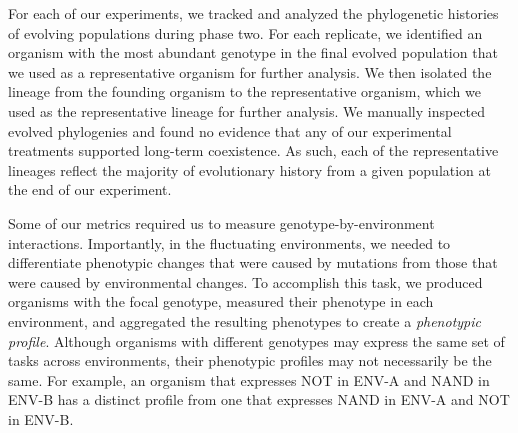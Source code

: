 


For each of our experiments, we tracked and analyzed the phylogenetic histories of evolving populations during phase two. 
For each replicate, we identified an organism with the most abundant genotype in the final evolved population that we used as a representative organism for further analysis.
We then isolated the lineage from the founding organism to the representative organism, which we used as the representative lineage for further analysis.
We manually inspected evolved phylogenies and found no evidence that any of our experimental treatments supported long-term coexistence. 
As such, each of the representative lineages reflect the majority of evolutionary history from a given population at the end of our experiment.

Some of our metrics required us to measure genotype-by-environment interactions.
Importantly, in the fluctuating environments, we needed to differentiate phenotypic changes that were caused by mutations from those that were caused by environmental changes.
To accomplish this task, we produced organisms with the focal genotype, measured their phenotype in each environment, and aggregated the resulting phenotypes to create a \textit{phenotypic profile}. 
Although organisms with different genotypes may express the same set of tasks across environments, their phenotypic profiles may not necessarily be the same.
For example, an organism that expresses NOT in ENV-A and NAND in ENV-B has a distinct profile from one that expresses NAND in ENV-A and NOT in ENV-B.


